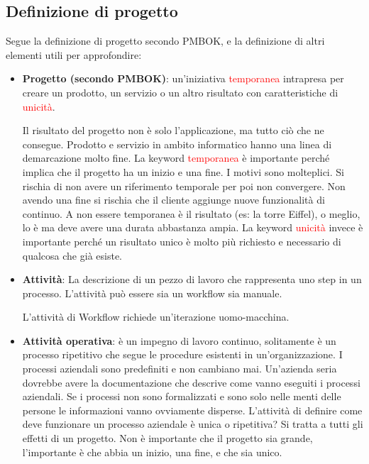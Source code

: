 \subsection{Definizione di progetto}
Segue la definizione di progetto secondo PMBOK, e la definizione di altri elementi utili per approfondire:
\begin{itemize}
	\item \textbf{Progetto (secondo PMBOK)}: un'iniziativa \textcolor{red}{temporanea} intrapresa per creare un prodotto, un servizio o un altro risultato con caratteristiche di \textcolor{red}{unicità}.
	\begin{info}
		Il risultato del progetto non è solo l'applicazione, ma tutto ciò che ne consegue. Prodotto e servizio in ambito informatico hanno una linea di demarcazione molto fine.\newline
		La keyword \textcolor{red}{temporanea} è importante perché implica che il progetto ha un inizio e una fine. I motivi sono molteplici. Si rischia di non avere un riferimento temporale per poi non convergere. Non avendo una fine si rischia che il cliente aggiunge nuove funzionalità di continuo. A non essere temporanea è il risultato (es: la torre Eiffel), o meglio, lo è ma deve avere una durata abbastanza ampia.\newline
		La keyword \textcolor{red}{unicità} invece è importante perché un risultato unico è molto più richiesto e necessario di qualcosa che già esiste.\newline
	\end{info}
	\item \textbf{Attività}: La descrizione di un pezzo di lavoro che rappresenta uno step in un processo. L'attività può essere sia un workflow sia manuale.
	\begin{info}
		L'attività di Workflow richiede un'iterazione uomo-macchina.
	\end{info}
	\item \textbf{Attività operativa}: è un impegno di lavoro continuo, solitamente è un processo ripetitivo che segue le procedure esistenti in un'organizzazione. I processi aziendali sono predefiniti e non cambiano mai. Un'azienda seria dovrebbe avere la documentazione che descrive come vanno eseguiti i processi aziendali. Se i processi non sono formalizzati e sono solo nelle menti delle persone le informazioni vanno ovviamente disperse.\newline\newline
	L'attività di definire come deve funzionare un processo aziendale è unica o ripetitiva? Si tratta a tutti gli effetti di un progetto. Non è importante che il progetto sia grande, l'importante è che abbia un inizio, una fine, e che sia unico.

\end{itemize}
